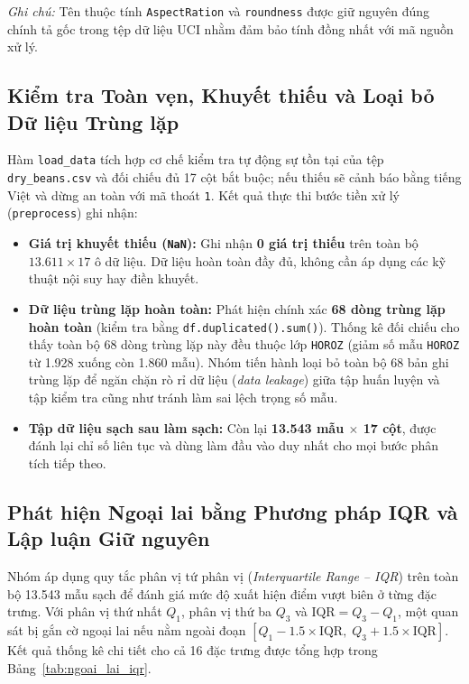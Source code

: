 \documentclass[a4paper,12pt]{report}
\begin{document}
\textit{Ghi chú:} Tên thuộc tính \texttt{AspectRation} và \texttt{roundness} được giữ nguyên đúng chính tả gốc trong tệp dữ liệu UCI nhằm đảm bảo tính đồng nhất với mã nguồn xử lý.

\subsection{Kiểm tra Toàn vẹn, Khuyết thiếu và Loại bỏ Dữ liệu Trùng lặp}
Hàm \texttt{load\_data} tích hợp cơ chế kiểm tra tự động sự tồn tại của tệp \texttt{dry\_beans.csv} và đối chiếu đủ 17 cột bắt buộc; nếu thiếu sẽ cảnh báo bằng tiếng Việt và dừng an toàn với mã thoát \texttt{1}. Kết quả thực thi bước tiền xử lý (\texttt{preprocess}) ghi nhận:
\begin{itemize}[leftmargin=*]
    \item \textbf{Giá trị khuyết thiếu (\texttt{NaN}):} Ghi nhận \textbf{0 giá trị thiếu} trên toàn bộ $13.611 \times 17$ ô dữ liệu. Dữ liệu hoàn toàn đầy đủ, không cần áp dụng các kỹ thuật nội suy hay điền khuyết.
    \item \textbf{Dữ liệu trùng lặp hoàn toàn:} Phát hiện chính xác \textbf{68 dòng trùng lặp hoàn toàn} (kiểm tra bằng \texttt{df.duplicated().sum()}). Thống kê đối chiếu cho thấy toàn bộ 68 dòng trùng lặp này đều thuộc lớp \texttt{HOROZ} (giảm số mẫu \texttt{HOROZ} từ 1.928 xuống còn 1.860 mẫu). Nhóm tiến hành loại bỏ toàn bộ 68 bản ghi trùng lặp để ngăn chặn rò rỉ dữ liệu (\textit{data leakage}) giữa tập huấn luyện và tập kiểm tra cũng như tránh làm sai lệch trọng số mẫu.
    \item \textbf{Tập dữ liệu sạch sau làm sạch:} Còn lại \textbf{13.543 mẫu $\times$ 17 cột}, được đánh lại chỉ số liên tục và dùng làm đầu vào duy nhất cho mọi bước phân tích tiếp theo.
\end{itemize}

\subsection{Phát hiện Ngoại lai bằng Phương pháp IQR và Lập luận Giữ nguyên}
Nhóm áp dụng quy tắc phân vị tứ phân vị (\textit{Interquartile Range -- IQR}) trên toàn bộ 13.543 mẫu sạch để đánh giá mức độ xuất hiện điểm vượt biên ở từng đặc trưng. Với phân vị thứ nhất $Q_1$, phân vị thứ ba $Q_3$ và $\text{IQR} = Q_3 - Q_1$, một quan sát bị gắn cờ ngoại lai nếu nằm ngoài đoạn $[Q_1 - 1.5 \times \text{IQR},\; Q_3 + 1.5 \times \text{IQR}]$. Kết quả thống kê chi tiết cho cả 16 đặc trưng được tổng hợp trong Bảng~\ref{tab:ngoai_lai_iqr}.
\end{document}
